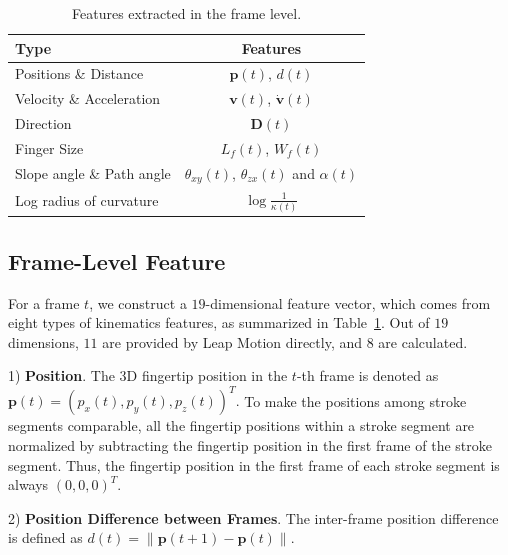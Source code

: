 \begin{table}[!b]
\centering  
\vspace{-3mm}
\caption{{Features extracted in the frame level. }}
\vspace{0mm}
\begin{tabular}{|l|c|}
    \hline \textbf{Type} & \textbf{Features }                            \\ \hline\hline
     Positions \& Distance & $\textbf{p}(t)$, $d(t)$ \\
        Velocity \& Acceleration & ${{\textbf{v}}}(t)$,  ${\dot{\textbf{v}}}(t)$       \\
        Direction & ${{\textbf{D}}}(t)$          \\
        Finger Size & $L_f(t)$, $W_f(t)$ \\        		
        Slope angle	\& Path angle & $\theta_{xy}(t)$, $\theta_{zx}(t)$ and $\alpha(t)$\\
        Log radius of curvature &   $\log\frac{1}{\kappa(t)}$ \\
        \hline
    \end{tabular}
    \label{tab:features}
\end{table}


\subsection{Frame-Level Feature}

For a frame $t$, we construct a $19$-dimensional feature vector, which comes from
eight types of kinematics features, as summarized in Table~\ref{tab:features}.  Out of $19$ dimensions, $11$ are provided by Leap Motion directly, and $8$ are calculated.


1) \textbf{Position}.
The 3D fingertip position in the $t$-th frame is denoted as $\textbf{p}(t)= (p_x(t),p_y(t), p_z(t))^T.$
To make the positions among stroke segments comparable, all the fingertip positions within a stroke segment
are normalized by subtracting the fingertip position 
in the first frame of the stroke segment. Thus, the fingertip position
in the first frame of each stroke segment is always $(0,0,0)^T$.

2) \textbf{Position Difference between Frames}.
The inter-frame position difference is  defined as
$d(t)=\|\textbf{p}(t+1)-\textbf{p}(t)\|.$

